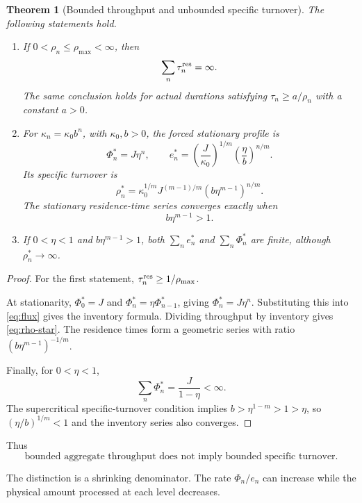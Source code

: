 \documentclass[11pt,a4paper]{article}
\newtheorem{theorem}{Theorem}[section]
\theoremstyle{definition}
\numberwithin{equation}{section}
\begin{document}
\begin{theorem}[Bounded throughput and unbounded specific turnover]
\label{thm:B}
The following statements hold.

\begin{enumerate}
\item If $0<\rho_n\le\rho_{\max}<\infty$, then
\[
\sum_n\tau_n^{\rm res}=\infty.
\]
The same conclusion holds for actual durations satisfying
$\tau_n\ge a/\rho_n$ with a constant $a>0$.

\item For $\kappa_n=\kappa_0b^n$, with $\kappa_0,b>0$,
the forced stationary profile is
\[
\Phi_n^*=J\eta^n,
\qquad
e_n^*=
\left(\frac{J}{\kappa_0}\right)^{1/m}
\left(\frac{\eta}{b}\right)^{n/m}.
\]
Its specific turnover is
\begin{equation}
\rho_n^*
=
\kappa_0^{1/m}J^{(m-1)/m}
\left(b\eta^{m-1}\right)^{n/m}.
\label{eq:rho-star}
\end{equation}
The stationary residence-time series converges exactly when
\[
b\eta^{m-1}>1.
\]

\item If $0<\eta<1$ and $b\eta^{m-1}>1$, both
$\sum_ne_n^*$ and $\sum_n\Phi_n^*$ are finite, although
$\rho_n^*\to\infty$.
\end{enumerate}
\end{theorem}

\begin{proof}
For the first statement,
$\tau_n^{\rm res}\ge1/\rho_{\max}$.

At stationarity, $\Phi_0^*=J$ and
$\Phi_n^*=\eta\Phi_{n-1}^*$, giving $\Phi_n^*=J\eta^n$.
Substituting this into \eqref{eq:flux} gives the inventory formula.
Dividing throughput by inventory gives \eqref{eq:rho-star}.
The residence times form a geometric series with ratio
$(b\eta^{m-1})^{-1/m}$.

Finally, for $0<\eta<1$,
\[
\sum_n\Phi_n^*=\frac{J}{1-\eta}<\infty.
\]
The supercritical specific-turnover condition implies
$b>\eta^{1-m}>1>\eta$, so
$(\eta/b)^{1/m}<1$ and the inventory series also converges.
\end{proof}

Thus
\begin{equation}
\boxed{
\text{bounded aggregate throughput does not imply
bounded specific turnover}.
}
\label{eq:throughput-distinction}
\end{equation}

The distinction is a shrinking denominator. The rate
$\Phi_n/e_n$ can increase while the physical amount processed
at each level decreases.
\end{document}
